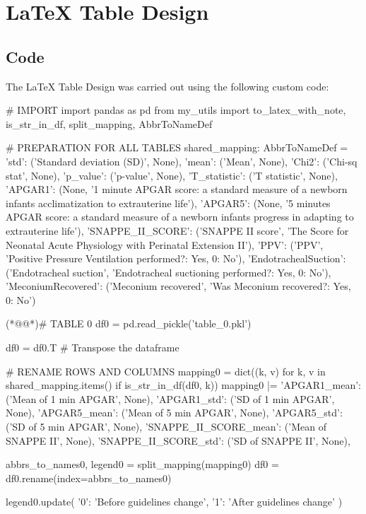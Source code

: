 \documentclass[11pt]{article}
\begin{document}
\section{LaTeX Table Design}
\subsection{{Code}}
The LaTeX Table Design was carried out using the following custom code:

\begin{python}

# IMPORT
import pandas as pd
from my_utils import to_latex_with_note, is_str_in_df, split_mapping, AbbrToNameDef

# PREPARATION FOR ALL TABLES
shared_mapping: AbbrToNameDef = {
    'std': ('Standard deviation (SD)', None),
    'mean': ('Mean', None),
    'Chi2': ('Chi-sq stat', None), 
    'p_value': ('p-value', None),
    'T_statistic': ('T statistic', None),
    'APGAR1': (None, '1 minute APGAR score: a standard measure of a newborn infants acclimatization to extrauterine life'),
    'APGAR5': (None, '5 minutes APGAR score: a standard measure of a newborn infants progress in adapting to extrauterine life'),
    'SNAPPE_II_SCORE': ('SNAPPE II score', 'The Score for Neonatal Acute Physiology with Perinatal Extension II'),
    'PPV': ('PPV', 'Positive Pressure Ventilation performed?: Yes, 0: No'),
    'EndotrachealSuction': ('Endotracheal suction', 'Endotracheal suctioning performed?: Yes, 0: No'),
    'MeconiumRecovered': ('Meconium recovered', 'Was Meconium recovered?: Yes, 0: No')
}

(*@@*)# TABLE 0
df0 = pd.read_pickle('table_0.pkl')

df0 = df0.T # Transpose the dataframe

# RENAME ROWS AND COLUMNS
mapping0 = dict((k, v) for k, v in shared_mapping.items() if is_str_in_df(df0, k)) 
mapping0 |= {
    'APGAR1_mean': ('Mean of 1 min APGAR', None),
    'APGAR1_std': ('SD of 1 min APGAR', None),
    'APGAR5_mean': ('Mean of 5 min APGAR', None),
    'APGAR5_std': ('SD of 5 min APGAR', None),
    'SNAPPE_II_SCORE_mean': ('Mean of SNAPPE II', None),
    'SNAPPE_II_SCORE_std': ('SD of SNAPPE II', None),
}

abbrs_to_names0, legend0 = split_mapping(mapping0)
df0 = df0.rename(index=abbrs_to_names0)

legend0.update({
    '0': 'Before guidelines change',
    '1': 'After guidelines change'
})


\end{python}
\end{document}
